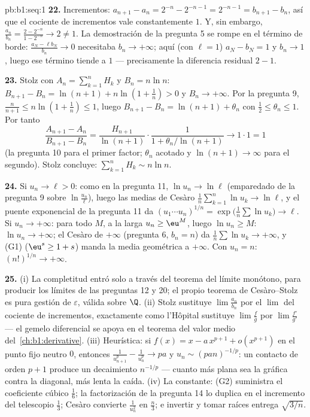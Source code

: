 \begin{solution}{pb:b1:seq:1}
\textbf{22.} Incrementos: $a_{n+1} - a_n = 2^{-n} - 2^{-n-1} =
2^{-n-1} = b_{n+1} - b_n$, así que el cociente de incrementos vale
constantemente $1$. Y, sin embargo,
$\frac{a_n}{b_n} = \frac{2 - 2^{-n}}{1 - 2^{-n}} \to 2 \neq 1$. La
demostración de la pregunta 5 se rompe en el término de borde:
$\frac{a_N - \ell b_N}{b_n} \to 0$ necesitaba $b_n \to +\infty$; aquí
(con $\ell = 1$) $a_N - b_N = 1$ y $b_n \to 1$, luego ese término
tiende a $1$ --- precisamente la diferencia residual $2 - 1$.

\textbf{23.} Stolz con $A_n = \sum_{k=1}^n H_k$ y $B_n = n\ln n$:
$B_{n+1} - B_n = \ln(n+1) + n\ln(1 + \frac1n) > 0$ y
$B_n \to +\infty$. Por la pregunta 9,
$\frac{n}{n+1} \leq n\ln(1 + \frac1n) \leq 1$, luego
$B_{n+1} - B_n = \ln(n+1) + \theta_n$ con
$\frac12 \leq \theta_n \leq 1$. Por tanto
\[
\frac{A_{n+1} - A_n}{B_{n+1} - B_n}
= \frac{H_{n+1}}{\ln(n+1)}\cdot
\frac{1}{1 + \theta_n/\ln(n+1)} \longrightarrow 1 \cdot 1 = 1
\]
(la pregunta 10 para el primer factor; $\theta_n$ acotado y
$\ln(n+1) \to \infty$ para el segundo). Stolz concluye:
$\sum_{k=1}^n H_k \sim n\ln n$.

\textbf{24.} Si $u_n \to \ell > 0$: como en la pregunta 11,
$\ln u_n \to \ln\ell$ (emparedado de la pregunta 9 sobre
$\ln\frac{u_n}{\ell}$), luego las medias de Cesàro
$\frac1n\sum_{k=1}^n \ln u_k \to \ln\ell$, y el puente exponencial de
la pregunta 11 da $(u_1\cdots u_n)^{1/n} =
\exp\bigl(\frac1n\sum\ln u_k\bigr) \to \ell$. Si $u_n \to +\infty$:
para todo $M$, a la larga $u_n \geq \eu^M$, luego $\ln u_n \geq M$:
$\ln u_n \to +\infty$; el Cesàro de $+\infty$ (pregunta 6, $b_n = n$)
da $\frac1n\sum \ln u_k \to +\infty$, y (G1) ($\eu^s \geq 1 + s$)
manda la media geométrica a $+\infty$. Con $u_n = n$:
$(n!)^{1/n} \to +\infty$.

\textbf{25.} (i) La completitud entró solo a través del teorema del
límite monótono, para producir los límites de las preguntas 12 y 20;
el propio teorema de Cesàro--Stolz es pura gestión de $\varepsilon$,
válida sobre $\Q$. (ii) Stolz sustituye $\lim \frac{a_n}{b_n}$ por el
$\lim$ del cociente de incrementos, exactamente como l'Hôpital
sustituye $\lim\frac fg$ por $\lim\frac{f'}{g'}$ --- el gemelo
diferencial se apoya en el teorema del valor medio
del~\cref{ch:b1:derivative}. (iii) Heurística: si
$f(x) = x - a\,x^{p+1} + o(x^{p+1})$ en el punto fijo neutro $0$,
entonces $\frac{1}{u_{n+1}^p} - \frac{1}{u_n^p} \to pa$ y
$u_n \sim (pan)^{-1/p}$: un contacto de orden $p + 1$ produce un
decaimiento $n^{-1/p}$ --- cuanto más plana sea la gráfica contra la
diagonal, más lenta la caída. (iv) La constante: (G2) suministra el
coeficiente cúbico $\frac16$; la factorización de la pregunta 14 lo
duplica en el incremento del telescopio $\frac13$; Cesàro convierte
$\frac{1}{u_n^2}$ en $\frac n3$; e invertir y tomar raíces entrega
$\sqrt{3/n}$.
\end{solution}
